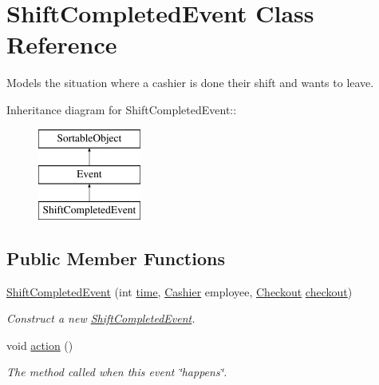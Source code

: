 \hypertarget{class_shift_completed_event}{
\section{ShiftCompletedEvent Class Reference}
\label{class_shift_completed_event}
}
Models the situation where a cashier is done their shift and wants to leave.  


Inheritance diagram for ShiftCompletedEvent::\begin{figure}[H]
\begin{center}
\leavevmode
\includegraphics[height=3cm]{class_shift_completed_event}
\end{center}
\end{figure}
\subsection*{Public Member Functions}
\begin{CompactItemize}
\item 
\hyperlink{class_shift_completed_event_12cfabd48a4b30fa4baa2b2b1d6ca718}{ShiftCompletedEvent} (int \hyperlink{class_event_d4c0fbb00c3fd993405df98bafcd52c5}{time}, \hyperlink{class_cashier}{Cashier} employee, \hyperlink{class_checkout}{Checkout} \hyperlink{class_shift_completed_event_91532b8cba3678f6be6d7ed6bbf33660}{checkout})
\begin{CompactList}\small\item\em Construct a new \hyperlink{class_shift_completed_event}{ShiftCompletedEvent}. \item\end{CompactList}\item 
void \hyperlink{class_shift_completed_event_4b09c21b802da89066245fbfc0111049}{action} ()
\begin{CompactList}\small\item\em The method called when this event \char`\"{}happens\char`\"{}. \item\end{CompactList}\end{CompactItemize}
